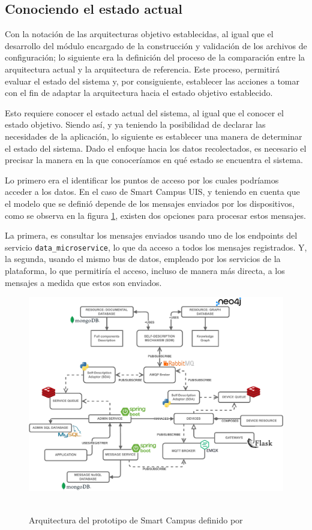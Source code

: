 \subsection{Conociendo el estado actual}

Con la notación de las arquitecturas objetivo establecidas, al igual que el desarrollo del módulo encargado de la construcción y validación de los archivos de configuración; lo siguiente era la definición del proceso de la comparación entre la arquitectura actual y la arquitectura de referencia. Este proceso, permitirá evaluar el estado del sistema y, por consiguiente, establecer las acciones a tomar con el fin de adaptar la arquitectura hacia el estado objetivo establecido.

Esto requiere conocer el estado actual del sistema, al igual que el conocer el estado objetivo. Siendo así, y ya teniendo la posibilidad de declarar las necesidades de la aplicación, lo siguiente es establecer una manera de determinar el estado del sistema. Dado el enfoque hacia los datos recolectados, es necesario el precisar la manera en la que conoceríamos en qué estado se encuentra el sistema.

Lo primero era el identificar los puntos de acceso por los cuales podríamos acceder a los datos. En el caso de Smart Campus UIS, y teniendo en cuenta que el modelo que se definió depende de los mensajes enviados por los dispositivos, como se observa en la figura \ref{fig:ArquitecturaSmartCampus}, existen dos opciones para procesar estos mensajes. 

La primera, es consultar los mensajes enviados usando uno de los endpoints del servicio \texttt{data\_microservice}, lo que da acceso a todos los mensajes registrados. Y, la segunda, usando el mismo bus de datos, empleado por los servicios de la plataforma, lo que permitiría el acceso, incluso de manera más directa, a los mensajes a medida que estos son enviados.

\begin{figure}[ht]
    \centering
    \caption{\\Arquitectura del prototipo de Smart Campus definido por }
    \includegraphics[width=\linewidth]{images/ArquitecturaSmartCampusUis.pdf}
    \label{fig:ArquitecturaSmartCampus}
\end{figure}

